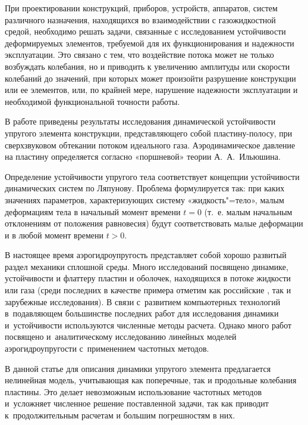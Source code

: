 
\makerutitle


При проектировании конструкций, приборов, устройств, аппаратов, систем различного назначения, находящихся во взаимодействии с газожидкостной средой, необходимо решать задачи, связанные с исследованием устойчивости деформируемых элементов, требуемой для их функционирования и надежности эксплуатации. Это связано с тем, что воздействие потока может не только возбуждать колебания, но и приводить к увеличению амплитуды или скорости колебаний до значений, при которых может произойти разрушение конструкции или ее элементов, или, по крайней мере, нарушение надежности эксплуатации и необходимой функциональной точности работы.

В работе приведены результаты исследования динамической устойчивости упругого элемента конструкции, представляющего собой пластину-полосу, при сверхзвуковом обтекании потоком идеального газа. Аэродинамическое давление на пластину определяется согласно «поршневой» теории А.~А.~Ильюшина.

Определение устойчивости упругого тела соответствует концепции устойчивости динамических систем по Ляпунову.  Проблема формулируется так: при каких значениях параметров, характеризующих систему «жидкость"=тело», малым деформациям тела в начальный момент времени $t=0$  (т.~е. малым начальным отклонениям от положения равновесия) будут соответствовать малые деформации и в любой момент времени $t>0$.

В настоящее время аэрогидроупругость представляет собой хорошо развитый раздел механики сплошной среды. Много исследований посвящено динамике, устойчивости и флаттеру пластин и оболочек, находящихся в потоке жидкости или газа (среди последних в качестве примера отметим как российские \cite{Algazin, Vedeneev, Guvernuk, Gounko, Kiko, Ryahovsky}, так и зарубежные \cite{Aulisa, Baghdasaryan, Brehm, Filippi, Kaunadis, Willems} исследования). 
В связи с~развитием компьютерных технологий в~подавляющем большинстве последних работ для исследования динамики и~устойчивости используются численные методы расчета. 
Однако много работ посвящено и~аналитическому исследованию линейных моделей аэрогидроупругости с~применением частотных методов. 

В данной статье для описания динамики упругого элемента предлагается нелинейная модель, учитывающая как поперечные, так и продольные колебания пластины. Это делает невозможным использование частотных методов и~усложняет численное решение поставленной задачи, так как приводит к~продолжительным расчетам и большим погрешностям в них. 

